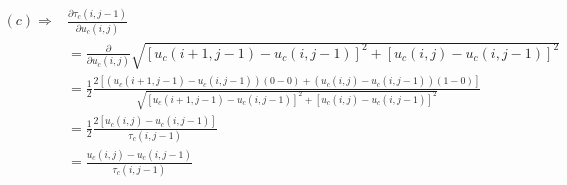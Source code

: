 \documentclass{paper}
\begin{document}
\begin{align}
(c) \Longrightarrow
	& \frac{\partial{\tau_{c}\left(i,j-1\right)}}{\partial u_{c}\left(i,j\right)} \nonumber \\
	&= \frac{\partial}{\partial{u_{c}\left(i,j\right)}} \sqrt{ \left[u_{c}(i+1,j-1)-u_{c}(i,j-1)\right]^2 + \left[u_{c}(i,j) - u_{c}(i,j-1)\right]^2} \nonumber \\
	&=  \frac{1}{2} \frac{2 [\left(u_{c}(i+1,j-1)-u_{c}(i,j-1)\right)(0 - 0) + \left(u_{c}(i,j) - u_{c}(i,j-1)\right)(1-0)]}{\sqrt{ \left[u_{c}(i+1,j-1)-u_{c}(i,j-1)\right]^2 + \left[u_{c}(i,j) - u_{c}(i,j-1)\right]^2}} \nonumber \\
	&= \frac{1}{2} \frac{2 \left[u_{c}(i,j)- u_{c} (i,j-1)\right] }{\tau_{c}\left(i,j-1\right)} \nonumber \\			
	&= \frac{u_{c}(i,j)-u_{c} \left(i,j-1\right)}{\tau_{c}\left(i,j-1\right)}
\end{align}
\end{document}
